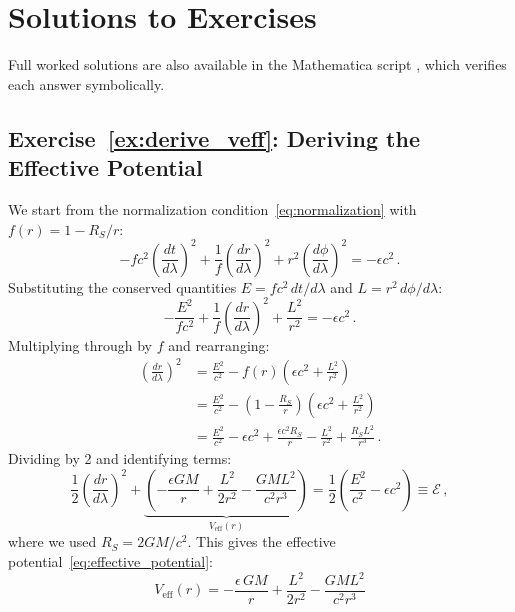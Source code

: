 
\section{Solutions to Exercises}
\label{sec:geodesics_solutions}

\noindent
Full worked solutions are also available in the Mathematica script
,
which verifies each answer symbolically.

\subsection*{Exercise~\ref{ex:derive_veff}: Deriving the Effective Potential}

We start from the normalization condition~\eqref{eq:normalization} with
$f(r) = 1 - R_S/r$:
\begin{equation*}
    -f c^2\!\left(\frac{dt}{d\lambda}\right)^{\!2}
    + \frac{1}{f}\left(\frac{dr}{d\lambda}\right)^{\!2}
    + r^2\!\left(\frac{d\phi}{d\lambda}\right)^{\!2} = -\epsilon c^2 \,.
\end{equation*}
Substituting the conserved quantities $E = f c^2\, dt/d\lambda$ and
$L = r^2\, d\phi/d\lambda$:
\begin{equation*}
    -\frac{E^2}{f c^2} + \frac{1}{f}\left(\frac{dr}{d\lambda}\right)^{\!2}
    + \frac{L^2}{r^2} = -\epsilon c^2 \,.
\end{equation*}
Multiplying through by $f$ and rearranging:
\begin{align*}
    \left(\frac{dr}{d\lambda}\right)^{\!2}
    &= \frac{E^2}{c^2} - f(r)\!\left(\epsilon c^2 + \frac{L^2}{r^2}\right) \\
    &= \frac{E^2}{c^2} - \left(1 - \frac{R_S}{r}\right)\!\left(\epsilon c^2 + \frac{L^2}{r^2}\right) \\
    &= \frac{E^2}{c^2} - \epsilon c^2 + \frac{\epsilon c^2 R_S}{r} - \frac{L^2}{r^2} + \frac{R_S L^2}{r^3} \,.
\end{align*}
Dividing by 2 and identifying terms:
\begin{equation*}
    \frac{1}{2}\left(\frac{dr}{d\lambda}\right)^{\!2}
    + \underbrace{\left(-\frac{\epsilon GM}{r}
    + \frac{L^2}{2r^2}
    - \frac{GML^2}{c^2 r^3}\right)}_{V_{\mathrm{eff}}(r)}
    = \frac{1}{2}\left(\frac{E^2}{c^2} - \epsilon c^2\right) \equiv \mathcal{E} \,,
\end{equation*}
where we used $R_S = 2GM/c^2$.  This gives the effective
potential~\eqref{eq:effective_potential}:
\[
    \boxed{V_{\mathrm{eff}}(r) = -\frac{\epsilon\, GM}{r}
    + \frac{L^2}{2r^2} - \frac{GML^2}{c^2 r^3}}
\]

